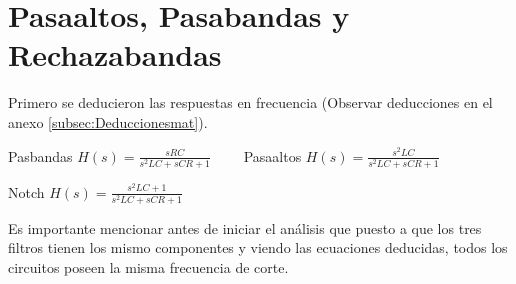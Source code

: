 \section{Pasaaltos, Pasabandas y Rechazabandas}


Primero se deducieron las respuestas en frecuencia (Observar deducciones en el anexo \ref{subsec:Deduccionesmat}).

\begin{centering}
    Pasbandas $H(s) = \frac{sRC}{s^2LC+ sCR +1} \qquad$ Pasaaltos $H(s) = \frac{s^2LC}{s^2LC+ sCR +1}$\par
    \vspace{0.5mm}
    Notch $H(s) = \frac{s^2LC+1}{s^2LC+ sCR +1}$\par 
\end{centering}
\vspace{1mm}
Es importante mencionar antes de iniciar el análisis que puesto a que los tres filtros tienen los mismo componentes y viendo las ecuaciones deducidas, todos los circuitos poseen la misma frecuencia de corte. 
